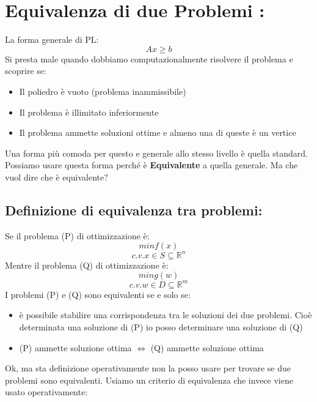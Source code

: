 \section{Equivalenza di due Problemi :} 
La forma generale di PL: 
\begin{equation*}
    Ax \geq b    
\end{equation*}
Si presta male quando dobbiamo computazionalmente risolvere il problema e scoprire se:
\begin{itemize}
    \item Il poliedro è vuoto (problema inammissibile)
    \item Il problema è illimitato inferiormente
    \item Il problema ammette soluzioni ottime e almeno una di queste è un vertice
\end{itemize}
Una forma più comoda per questo e generale allo stesso livello è quella standard. Possiamo usare questa forma perché è \textbf{Equivalente} a quella generale. Ma che vuol dire che è equivalente? 

\subsection{Definizione di equivalenza tra problemi:}

Se il problema (P) di ottimizzazione è:
\begin{equation*}
    min f(x)
\end{equation*}
\begin{equation*}
    c.v. x \in S \subseteq \mathbb{R}^n
\end{equation*}
Mentre il problema (Q) di ottimizzazione è:
\begin{equation*}
    min g(w)
\end{equation*}
\begin{equation*}
    c.v. w \in D \subseteq \mathbb{R}^m
\end{equation*}
I problemi (P) e (Q) sono equivalenti se e solo se:
\begin{itemize}
    \item è possibile stabilire una corrispondenza tra le soluzioni dei due problemi. Cioè determinata una soluzione di (P) io posso determinare una soluzione di (Q)
    \item (P) ammette soluzione ottima $\Longleftrightarrow$ (Q) ammette soluzione ottima
\end{itemize}
Ok, ma sta definizione operativamente non la posso usare per trovare se due problemi sono equivalenti. Usiamo un criterio di equivalenza che invece viene usato operativamente:


